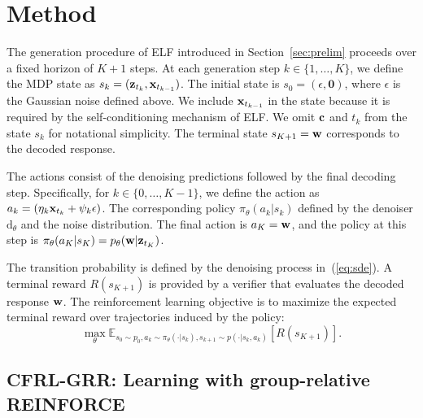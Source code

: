 \section{Method}
The generation procedure of ELF introduced in Section~\ref{sec:prelim} proceeds over a fixed horizon of $K+1$ steps. At each generation step $k\in\{1,\ldots,K\}$, we define the MDP state as $s_k = ({\mathbf{z}}_{t_k}, {\mathbf{x}}_{t_{k-1}})$. The initial state is $s_0 = (\epsilon, \mathbf{0})$, where $\epsilon$ is the Gaussian noise defined above. We include ${\mathbf{x}}_{t_{k-1}}$ in the state because it is required by the self-conditioning mechanism of ELF. We omit ${\mathbf{c}}$ and $t_{k}$ from the state $s_k$ for notational simplicity. The terminal state $s_{K+1} = {\mathbf{w}}$  corresponds to the decoded response. 

The actions consist of the denoising predictions followed by the final decoding step. Specifically, for $k \in \{0, \ldots, K-1\}$, we define the action as \textcolor{blue}{$a_{k} = (\eta_k {\mathbf{x}}_{t_{k}} + \psi_k \epsilon)$}. The corresponding policy $\pi_\theta(a_k | s_k)$ defined by the denoiser $\mathrm{d}_\theta$ and the noise distribution. The final action is $a_{K} = {\mathbf{w}}$, and the policy at this step is $\pi_\theta(a_K | s_K)=p_\theta({\mathbf{w}} | {\mathbf{z}}_{t_K})$. 

The transition probability is defined by the denoising process in~(\ref{eq:sde}). A terminal reward  $R(s_{K+1})$ is provided by a verifier that evaluates 
the decoded response ${\mathbf{w}}$. The reinforcement learning objective is to maximize the expected terminal reward over trajectories induced by the policy:
\begin{equation}
\max_\theta \mathbb E_{s_0\sim p_0, a_k\sim \pi_\theta(\cdot|s_k), s_{k+1}\sim p(\cdot|s_k, a_k)}[R(s_{K+1})].
\label{eq:objective}
\end{equation}

\subsection{CFRL-GRR: Learning with group-relative REINFORCE}
\label{sec:grr}

